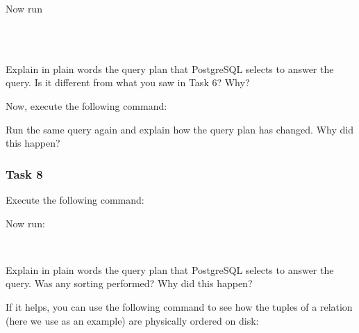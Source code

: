 \noindent {}

\vgap

\noindent Now run

\vgap

\noindent {} \\
\noindent {} \\
\noindent {}

\vgap

\noindent Explain in plain words the query plan that PostgreSQL selects to answer the query. Is it different from what you saw in Task 6? Why?

\vgap

\noindent Now, execute the following command:

\vgap

\noindent {}

\vgap

\noindent Run the same query again and explain how the query plan has changed. Why did this happen?


%
%
%
%

\subsubsection{Task 8}

Execute the following command:

\vgap

\noindent {}

\vgap

\noindent Now run:

\vgap

\noindent {} \\

\vgap

\noindent Explain in plain words the query plan that PostgreSQL selects to answer the query. Was any sorting performed? Why did this happen?

\vgap

\noindent If it helps, you can use the following command to see how the tuples of a relation (here we use  as an example) are physically ordered on disk:

